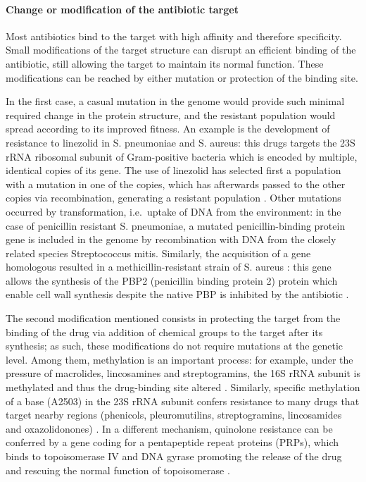 \paragraph{Change or modification of the antibiotic target}
Most antibiotics bind to the target with high affinity and therefore specificity. Small modifications of the target structure can disrupt an efficient binding of the antibiotic, still allowing the target to maintain its normal function. These modifications can be reached by either mutation or protection of the binding site.

In the first case, a casual mutation in  the genome would provide such minimal required change in the protein structure, and the resistant population would spread according to its improved fitness.
%
An example is the development of resistance to linezolid in S. pneumoniae and S. aureus: this drugs targets the 23S rRNA ribosomal subunit of Gram-positive bacteria which is encoded by multiple, identical copies of its gene. The use of linezolid has selected first a population with a mutation in one of the copies, which has afterwards passed to the other copies via recombination, generating a resistant population \cite{Billal2011,Gao2010}.
%
Other mutations occurred by transformation, i.e.\ uptake of DNA from the environment: in the case of penicillin resistant S. pneumoniae, a mutated penicillin-binding protein gene is included in the genome by recombination with DNA from the closely related species Streptococcus mitis. Similarly, the acquisition of a gene homologous resulted in a methicillin-resistant strain of S. aureus \cite{Shore2011}: this gene allows the synthesis of the PBP2 (penicillin binding protein 2) protein which enable cell wall synthesis despite the native PBP is inhibited by the antibiotic \cite{Katayama2000}.

The second modification mentioned consists in protecting the target from the binding of the drug via addition of chemical groups to the target after its synthesis; as such, these modifications do not require mutations at the genetic level.
%
Among them, methylation is an important process: for example, under the pressure of macrolides, lincosamines and streptogramins, the 16S rRNA subunit is methylated and thus the drug-binding site altered \cite{Kumar2014}. Similarly, specific methylation of a base (A2503) in the 23S rRNA subunit confers resistance to many drugs that target nearby regions (phenicols, pleuromutilins, streptogramins, lincosamides and oxazolidonones) \cite{Long2006}.
%
In a different mechanism, quinolone resistance can be conferred by a gene coding for a pentapeptide repeat proteins (PRPs), which binds to topoisomerase IV and DNA gyrase promoting the release of the drug and rescuing the normal function of topoisomerase \cite{Vetting2011}.

